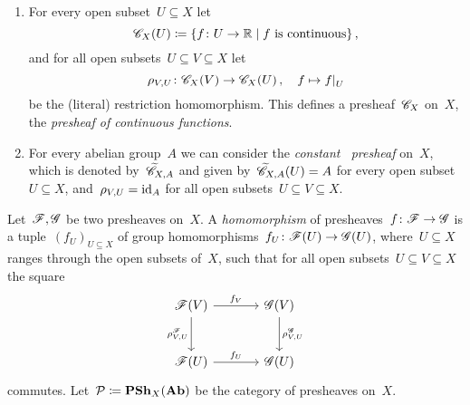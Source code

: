 \begin{example}
\begin{enumerate}
      \begin{examplenonum}
        \leavevmode
        \begin{enumerate}
          \item
            For every open subset~$U \subseteq X$ let
            \[
                        \cont_X(U)
              \defined  \{
                          f \colon U \to \Real
                        \suchthat
                          \text{$f$ is continuous}
                        \} \,,
            \]
            and for all open subsets~$U \subseteq V \subseteq X$ let
            \[
                      \rho_{V,U}
              \colon  \cont_X(V)
              \to     \cont_X(U) \,,
              \quad   f
              \mapsto \restrict{f}{U}
            \]
            be the (literal) restriction homomorphism.
            This defines a presheaf~$\mathscr{C}_X$ on~$X$, the \emph{presheaf of continuous functions}.
          \item
            For every abelian group~$A$ we can consider the \emph{constant~ presheaf} on~$X$, which is denoted by~$\widetilde{\mathscr{C}}_{X,A}$ and given by~$\widetilde{\mathscr{C}}_{X,A}(U) = A$ for every open subset~$U \subseteq X$, and~$\rho_{V,U} = \operatorname{id}_A$ for all open subsets~$U \subseteq V \subseteq X$.
        \end{enumerate}
      \end{examplenonum}
      
      Let~$\mathscr{F}, \mathscr{G}$ be two presheaves on~$X$.
      A \emph{homomorphism} of presheaves~$f \colon \mathscr{F} \to \mathscr{G}$ is a tuple~$(f_U)_{U \subseteq X}$ of group homomorphisms~$f_U \colon \mathscr{F}(U) \to \mathscr{G}(U)$, where~$U \subseteq X$ ranges through the open subsets of~$X$, such that for all open subsets~$U \subseteq V \subseteq X$ the square
      \[
        \begin{tikzcd}[sep = large]
            \Fs(V)
            \arrow{r}[above]{f_V}
            \arrow{d}[left]{\rho_{V,U}^\Fs}
          & \Gs(V)
            \arrow{d}[right]{\rho_{V,U}^\Gs}
          \\
            \Fs(U)
            \arrow{r}[above]{f_U}
          & \Gs(U)
        \end{tikzcd}
      \]
      commutes.
      Let~$\mathcal{P} \coloneqq \mathbf{PSh}_X(\mathbf{Ab})$ be the category of presheaves on~$X$.
      

\end{enumerate}
\end{example}

